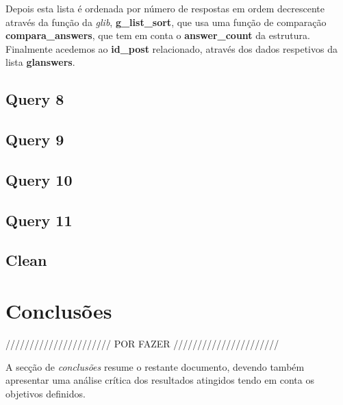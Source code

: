 \documentclass[a4paper]{article}
\begin{document}
Depois esta lista é ordenada por número de respostas em ordem decrescente 
através da função da \textit{glib}, \textbf{g\_list\_sort}, que usa uma 
função de comparação \textbf{compara\_answers}, que tem em conta o \textbf
{answer\_count} da estrutura. Finalmente acedemos ao \textbf{id\_post} 
relacionado, através dos dados respetivos da lista \textbf{glanswers}.

\subsection{Query 8}

\subsection{Query 9}

\subsection{Query 10}

\subsection{Query 11}

\subsection{Clean}

\section{Conclusões}
\label{sec:conclusao}

////////////////////// POR FAZER //////////////////////

A secção de \emph{conclusões} resume o restante documento, devendo
também apresentar uma análise crítica dos resultados atingidos tendo
em conta os objetivos definidos.
\end{document}
